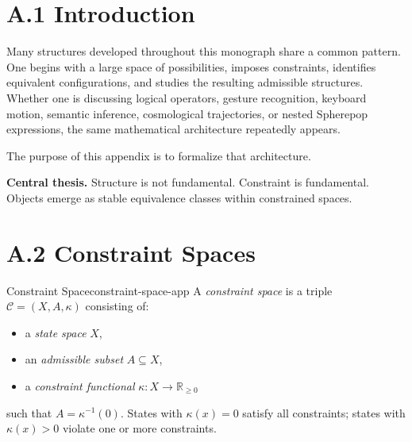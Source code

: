 
\section*{A.1 Introduction}

Many structures developed throughout this monograph share a common pattern.
One begins with a large space of possibilities, imposes constraints, identifies
equivalent configurations, and studies the resulting admissible structures.
Whether one is discussing logical operators, gesture recognition, keyboard
motion, semantic inference, cosmological trajectories, or nested Spherepop
expressions, the same mathematical architecture repeatedly appears.

The purpose of this appendix is to formalize that architecture.

\begin{tcolorbox}[enhanced, colback=RSVPdeep, colframe=RSVPdeep,
  coltext=white, arc=6pt, boxrule=0pt,
  left=6mm, right=6mm, top=5mm, bottom=5mm]
  \textbf{Central thesis.} Structure is not fundamental.
  Constraint is fundamental. Objects emerge as stable equivalence classes
  within constrained spaces.
\end{tcolorbox}

\section*{A.2 Constraint Spaces}

\begin{definition}{Constraint Space}{constraint-space-app}
  A \emph{constraint space} is a triple $\mathcal{C} = (X, A, \kappa)$
  consisting of:
  \begin{itemize}
    \item a \emph{state space} $X$,
    \item an \emph{admissible subset} $A \subseteq X$,
    \item a \emph{constraint functional}
      $\kappa : X \to \mathbb{R}_{\geq 0}$
  \end{itemize}
  such that $A = \kappa^{-1}(0)$. States with $\kappa(x) = 0$ satisfy all
  constraints; states with $\kappa(x) > 0$ violate one or more constraints.
\end{definition}

